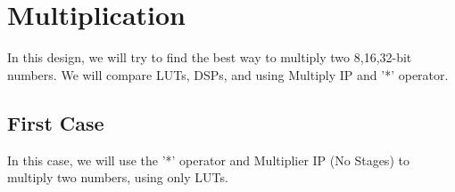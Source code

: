 \documentclass{report}
\begin{document}




\section{Multiplication}
In this design, we will try to find the best way to multiply two 8,16,32-bit numbers. We will compare LUTs, DSPs, and using Multiply IP and '*' operator.

\subsection{First Case}
In this case, we will use the '*' operator and Multiplier IP (No Stages) to multiply two numbers, using only LUTs.
\end{document}
